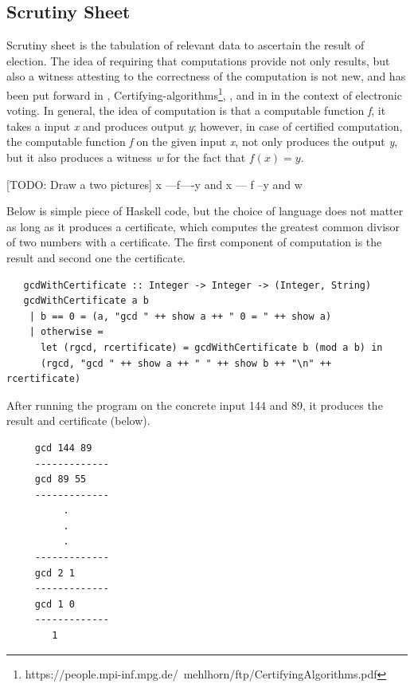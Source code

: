    \subsection{Scrutiny Sheet}
   Scrutiny sheet is the tabulation of relevant data to ascertain the result of election. 
   The idea of requiring that computations provide not only results, but also a witness attesting
    to the correctness of the computation is not new,
	and has been put forward in \citep{89397},  
	Certifying-algorithms\footnote{https://people.mpi-inf.mpg.de/~mehlhorn/ftp/CertifyingAlgorithms.pdf},
	\cite{Arkoudas:2005:DRC}, and in \cite{Schurmann:2009:EET} in the context
	of electronic voting.   In general, the idea of computation is that a computable function \textit{f}, it takes 
	a input \textit{x} and produces output \textit{y}; however, in case of certified computation, 
	the computable function \textit{f} on the given input \textit{x}, not only produces the output \textit{y},
	but it also produces a witness \textit{w} for the fact that $ f (x) = y$.
	
	[TODO: Draw a two pictures] 
	x ---f----y and x --- f --y and w 


  \noindent
   Below is simple piece of Haskell code, but the choice of language does not matter as long as it 
   produces a certificate, which computes the greatest common divisor 
   of two numbers with a certificate.  The first component of computation is the result and second one 
   the certificate. 
   \begin{verbatim}
   gcdWithCertificate :: Integer -> Integer -> (Integer, String)
   gcdWithCertificate a b
    | b == 0 = (a, "gcd " ++ show a ++ " 0 = " ++ show a)
    | otherwise = 
      let (rgcd, rcertificate) = gcdWithCertificate b (mod a b) in
      (rgcd, "gcd " ++ show a ++ " " ++ show b ++ "\n" ++ rcertificate)
   \end{verbatim}
  
   \noindent 
   After running the program on the concrete input 144 and 89, it produces the result and certificate (below).
   \begin{verbatim}
     gcd 144 89
     -------------
     gcd 89 55
     -------------
          .
          .
          .
     -------------
     gcd 2 1
     -------------
     gcd 1 0 
     -------------
        1
   \end{verbatim}
   
